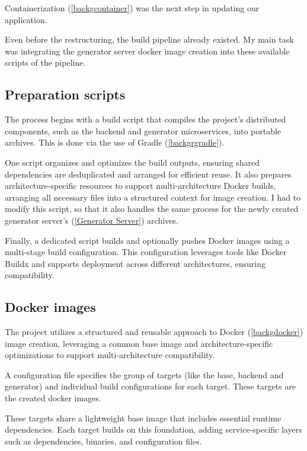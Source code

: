 		Containerization (\ref{backgcontainer}) was the next step in 
		updating our application. 

		Even before the restructuring, the build pipeline already existed. My main task was integrating the generator server docker image creation
		into these available scripts of the pipeline. 

		\subsection{Preparation scripts}\label{Preparation scripts}
			The process begins with a build script that compiles the project's distributed components, such as the backend and generator microservices, into portable archives. 
			This is done via the use of Gradle (\ref{backgrgradle}).

			One script organizes and optimizes the build outputs, ensuring shared dependencies are deduplicated and arranged for efficient reuse. 
			It also prepares architecture-specific resources to support multi-architecture Docker builds, arranging all necessary files into a structured context for image creation.
			I had to modify this script, so that it also handles the same process for the newly created generator server's (\ref{Generator Server}) archives.

			Finally, a dedicated script builds and optionally pushes Docker images using a multi-stage build configuration. 
			This configuration leverages tools like Docker Buildx and supports deployment across different architectures, ensuring compatibility. 

		\subsection{Docker images}\label{Docker images}
			The project utilizes a structured and reusable approach to Docker (\ref{backgdocker}) image creation, leveraging a common base image and architecture-specific 
			optimizations to support multi-architecture compatibility.

			A configuration file specifies the group of targets (like the base, backend and generator) and individual build configurations for each target. 
			These targets are the created docker images.

			These targets share a lightweight base image that includes essential runtime dependencies. 
			Each target builds on this foundation, adding service-specific layers such as dependencies, binaries, and configuration files.

